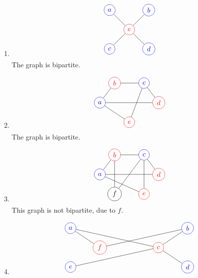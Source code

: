 \documentclass[12pt, A4]{article}
\begin{document}
\begin{enumerate}
\begin{tasks}
					\end{tasks}
				\item
					\[\begin{tikzpicture}
						\node[circle, draw, blue] (a) at (-1, 1) {\(a\)};
						\node[circle, draw, blue] (b) at (1, 1) {\(b\)};
						\node[circle, draw, blue] (c) at (-1, -1) {\(c\)};
						\node[circle, draw, blue] (d) at (1, -1) {\(d\)};
						\node[circle, draw, red] (e) at (0, 0) {\(e\)};
						\draw (a) -- (e) -- (d);
						\draw (c) -- (e) -- (b);
					\end{tikzpicture}\]
					The graph is bipartite.
				\item
					\[\begin{tikzpicture}
						\node[circle, draw, blue] (a) at (-1.5, 0) {\(a\)};
						\node[circle, draw, red] (b) at (-0.75, 1) {\(b\)};
						\node[circle, draw, blue] (c) at (0.75, 1) {\(c\)};
						\node[circle, draw, red] (d) at (1.5, 0) {\(d\)};
						\node[circle, draw, red] (e) at (0, -1) {\(e\)};
						\draw (a) -- (b);
						\draw (a) -- (d);
						\draw (a) -- (e);
						\draw (b) -- (c);
						\draw (c) -- (d);
						\draw (c) -- (e);
					\end{tikzpicture}\]
					The graph is bipartite.
				\item
					\[\begin{tikzpicture}
						\node[circle, draw, blue] (a) at (-1.5, 0) {\(a\)};
						\node[circle, draw, red] (b) at (-0.75, 1) {\(b\)};
						\node[circle, draw, blue] (c) at (0.75, 1) {\(c\)};
						\node[circle, draw, red] (d) at (1.5, 0) {\(d\)};
						\node[circle, draw, red] (e) at (0.75, -1) {\(e\)};
						\node[circle, draw] (f) at (-0.75, -1) {\(f\)};
						\draw (a) -- (b);
						\draw (a) -- (d);
						\draw (a) -- (e);
						\draw (b) -- (c);
						\draw (b) -- (f);
						\draw (c) -- (d);
						\draw (c) -- (e);
						\draw (c) -- (f);
					\end{tikzpicture}\]
					This graph is not bipartite, due to \(f\).
				\item
					\[\begin{tikzpicture}
						\node[circle, draw, blue] (a) at (-3, 1) {\(a\)};
						\node[circle, draw, blue] (b) at (3, 1) {\(b\)};
						\node[circle, draw, red] (c) at (1.5, 0) {\(c\)};
						\node[circle, draw, blue] (d) at (3, -1) {\(d\)};
						\node[circle, draw, blue] (e) at (-3, -1) {\(e\)};
						\node[circle, draw, red] (f) at (-1.5, 0) {\(f\)};
						\draw (a) -- (c);
						\draw (a) -- (f);
						\draw (b) -- (f);
						\draw (b) -- (c);
						\draw (c) -- (d);
						\draw (c) -- (e);

\end{tikzpicture}\]
\end{enumerate}
\end{document}
